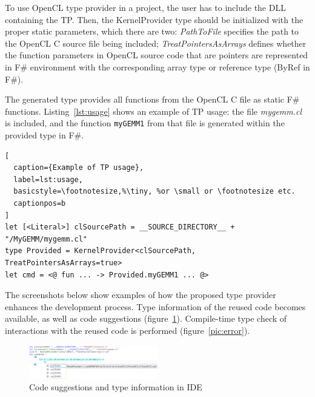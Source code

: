 \documentclass[sigplan]{acmart}\settopmatter{}
\begin{document}
To use OpenCL type provider in a project, the user has to include the DLL containing the TP.
Then, the KernelProvider type should be initialized with the proper static parameters, which there are two: \textit{PathToFile} specifies the path to the OpenCL C source file being included;
\textit{TreatPointersAsArrays} defines whether the function parameters in OpenCL source code that are pointers are represented in F\# environment with the corresponding array type or reference type (ByRef in F\#).


The generated type provides all functions from the OpenCL C file as static F\# functions.
Listing~\ref{lst:usage} shows an example of TP usage: the file \textit{mygemm.cl} is included, and the function \lstinline{myGEMM1} from that file is generated within the provided type in F\#.



\lstset{language=FSharp}
\begin{lstlisting}[
  caption={Example of TP usage},
  label=lst:usage,
  basicstyle=\footnotesize,%\tiny, %or \small or \footnotesize etc.
  captionpos=b
]
let [<Literal>] clSourcePath = __SOURCE_DIRECTORY__ + "/MyGEMM/mygemm.cl"
type Provided = KernelProvider<clSourcePath, TreatPointersAsArrays=true>
let cmd = <@ fun ... -> Provided.myGEMM1 ... @>
\end{lstlisting}

The screenshots below show examples of how the proposed type provider enhances the development process. 
Type information of the reused code becomes available, as well as code suggestions (figure~\ref{pic:suggestions}).
Compile-time type check of interactions with the reused code is performed (figure~\ref{pic:error}).


\begin{figure}[h]
\centering
\includegraphics[width=0.5\textwidth]{graphics/example-multiple-suggestions.png}
\caption{Code suggestions and type information in IDE}
\label{pic:suggestions}
\end{figure}
\end{document}
